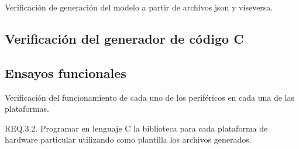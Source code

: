 Verificación de generación del modelo a partir de archivos json y viseversa.

\subsection{Verificación del generador de código C}

\subsection{Ensayos funcionales}

Verificación del funcionamiento de cada uno de los periféricos en cada una de las plataformas.


REQ.3.2. Programar en lenguaje C la biblioteca para cada plataforma de hardware particular utilizando como plantilla los archivos generados.

